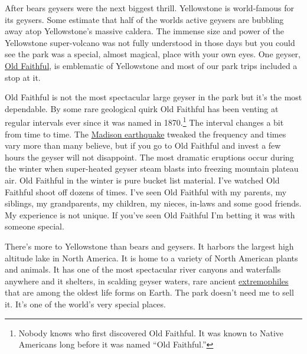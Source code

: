 After bears geysers were the next biggest thrill. Yellowstone is
world-famous for its geysers. Some estimate that half of the worlds
active geysers are bubbling away atop Yellowstone's massive caldera. The
immense size and power of the Yellowstone super-volcano was not fully
understood in those days but you could see the park was a special,
almost magical, place with your own eyes. One geyser,
\href{http://www.nps.gov/yell/planyourvisit/noldfaith.htm}{Old
Faithful}, is emblematic of Yellowstone and most of our park trips
included a stop at it.

Old Faithful is not the most spectacular large geyser in the park but
it's the most dependable. By some rare geological quirk Old Faithful has
been venting at regular intervals ever since it was named in
1870.\footnote{
Nobody knows who first discovered Old Faithful. It was known to Native
Americans long before it was named ``Old Faithful.''
} The interval changes a bit from
time to time. The
\href{http://en.wikipedia.org/wiki/1959\_Yellowstone\_earthquake}{Madison
earthquake} tweaked the frequency and times vary more than many believe,
but if you go to Old Faithful and invest a few hours the geyser will not
disappoint. The most dramatic eruptions occur during the winter when
super-heated geyser steam blasts into freezing mountain plateau air. Old
Faithful in the winter is pure bucket list material. I've watched Old
Faithful shoot off dozens of times. I've seen Old Faithful with my
parents, my siblings, my grandparents, my children, my nieces, in-laws
and some good friends. My experience is not unique. If you've seen Old
Faithful I'm betting it was with someone special.

There's more to Yellowstone than bears and geysers. It harbors the
largest high altitude lake in North America. It is home to a variety of
North American plants and animals. It has one of the most spectacular
river canyons and waterfalls anywhere and it shelters, in scalding
geyser waters, rare ancient
\href{http://en.wikipedia.org/wiki/Extremophile}{extremophiles} that are
among the oldest life forms on Earth. The park doesn't need me to sell
it. It's one of the world's very special places.



